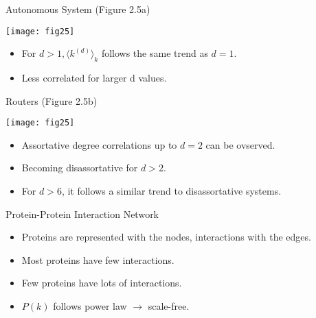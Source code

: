 \documentclass{beamer}
\begin{document}

\begin{frame}{Autonomous System (Figure 2.5a)}
\begin{center}
\texttt{[image: fig25]}
\end{center}

\begin{itemize}
 \item For $d>1, \langle k^{(d)} \rangle_k$ follows the same trend as $d=1$.
 \item Less correlated for larger d values.
\end{itemize}

\end{frame}



\begin{frame}{Routers (Figure 2.5b)}
\begin{center}
\texttt{[image: fig25]}
\end{center}

\begin{itemize}
 \item Assortative degree correlations up to $d=2$ can be ovserved.
 \item Becoming disassortative for $d>2$.
 \item For $d>6$, it follows a similar trend to disassortative systems.
\end{itemize}

\end{frame}


\begin{frame}{Protein-Protein Interaction Network}

\begin{itemize}
 \item Proteins are represented with the nodes, interactions with the edges.
 \item Most proteins have few interactions.
 \item Few proteins have lots of interactions.
 \item $P(k)$ follows power law $\rightarrow$ scale-free.
\end{itemize}

\end{frame}


\end{document}
